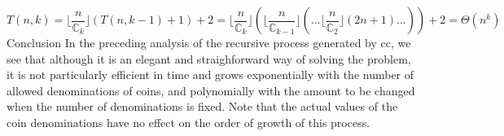 \documentclass[
]{article}
\begin{document}
\[ T\left(n,k\right) = \lfloor {\frac {n} { \mathbb{C}_{k} } } \rfloor \left( T\left(n, k-1\right) + 1 \right) + 2 = \lfloor {\frac {n} { \mathbb{C}_{k} } } \rfloor \left( \lfloor {\frac {n} { \mathbb{C}_{k-1} } } \rfloor \left(... \lfloor \frac {n} { \mathbb{C}_{2} } \rfloor \left(2n+1\right) ...\right) \right) + 2 = \Theta\left(n^k\right) \]
Conclusion In the preceding analysis of the recursive process generated
by cc, we see that although it is an elegant and straighforward way of
solving the problem, it is not particularly efficient in time and grows
exponentially with the number of allowed denominations of coins, and
polynomially with the amount to be changed when the number of
denominations is fixed. Note that the actual values of the coin
denominations have no effect on the order of growth of this process.
\end{document}
